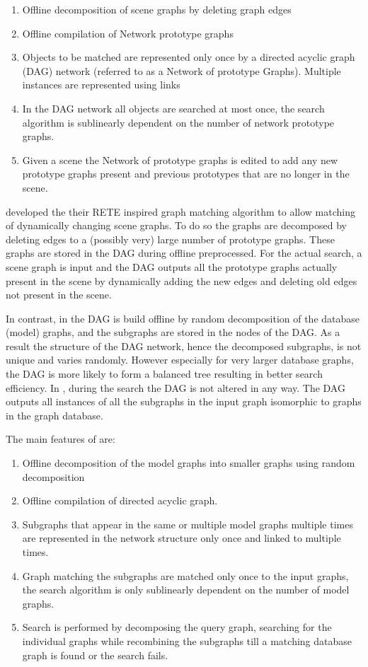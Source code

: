 \begin{enumerate}
\item Offline decomposition of scene graphs by deleting graph edges
\item Offline compilation of Network prototype graphs
\item Objects to be matched are represented only once by a directed acyclic graph (DAG) network (referred to as a Network of prototype Graphs). Multiple instances are represented using links
\item In the DAG network  all objects are searched at most  once, the search algorithm is sublinearly dependent on the number of network prototype graphs.
\item Given a scene the Network of prototype graphs is edited to add any new prototype graphs present and previous prototypes that are no longer in the scene.
\end{enumerate}
 
\cite{bunke_glauser_tran1991} developed the their RETE inspired graph matching algorithm to allow matching of dynamically changing scene graphs. To do so the graphs are decomposed by deleting edges to a (possibly very) large number of prototype graphs. These graphs are stored in the DAG during offline preprocessed. For the actual search, a scene graph is input and the DAG outputs all the prototype graphs actually present in the scene by dynamically  adding the new edges and deleting old edges not present in the scene.

In contrast, in \cite{messmer_bunke2000} the DAG is build offline by random decomposition of the database (model) graphs, and the subgraphs are stored in the nodes of the DAG. As a result the structure of the DAG network, hence the decomposed subgraphs, is not unique and varies randomly. However especially for very larger database graphs, the DAG is more likely to form a balanced tree resulting in better search efficiency. In \cite{bunke_glauser_tran1991}, during the search the DAG is not altered in any way. The DAG outputs all instances of all the subgraphs in the input graph isomorphic to graphs in the graph database.  

The main features of \cite{bunke_glauser_tran1991} are:

\begin{enumerate}
\item Offline decomposition of the model graphs into smaller graphs using random decomposition
\item Offline compilation of directed acyclic graph.
\item Subgraphs that appear in the same or multiple model graphs multiple times are represented in the network structure only once and linked to multiple times.
\item Graph matching the subgraphs are matched only once to the input graphs, the search algorithm is only sublinearly dependent on the number of model graphs.
\item Search is performed by decomposing the query graph, searching for the individual graphs while recombining the subgraphs till a matching database graph is found or the search fails.
\end{enumerate}


